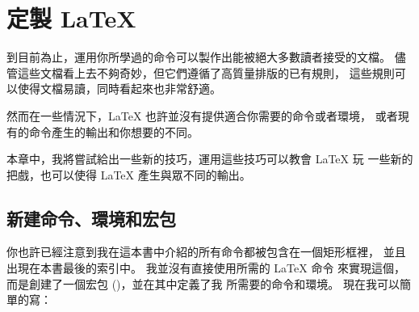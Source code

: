 
\chapter{定製 \LaTeX}
\begin{intro}
到目前為止，運用你所學過的命令可以製作出能被絕大多數讀者接受的文檔。
儘管這些文檔看上去不夠奇妙，但它們遵循了高質量排版的已有規則，
這些規則可以使得文檔易讀，同時看起來也非常舒適。

然而在一些情況下，\LaTeX{} 也許並沒有提供適合你需要的命令或者環境，
或者現有的命令產生的輸出和你想要的不同。

本章中，我將嘗試給出一些新的技巧，運用這些技巧可以教會 \LaTeX{} 玩
一些新的把戲，也可以使得 \LaTeX{} 產生與眾不同的輸出。
\end{intro}


\section{新建命令、環境和宏包}
你也許已經注意到我在這本書中介紹的所有命令都被包含在一個矩形框裡，
並且出現在本書最後的索引中。 我並沒有直接使用所需的 \LaTeX{} 命令
來實現這個，而是創建了一個宏包 ()，並在其中定義了我
所需要的命令和環境。 現在我可以簡單的寫：

